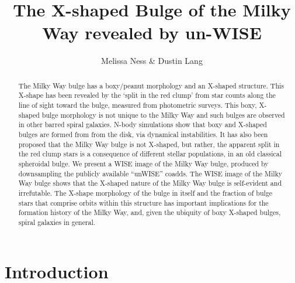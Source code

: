 \documentclass[12pt, preprint]{aastex}
\begin{document}
\title{The X-shaped Bulge of the Milky Way revealed by un-WISE} 
\author{%
Melissa Ness \& %
Dustin Lang
}
%
\begin{abstract}%
The Milky Way bulge has a boxy/peanut morphology and an X-shaped structure. This X-shape has been revealed by the `split in the red clump' from 
star counts along the line of sight toward the bulge, measured from photometric surveys. This boxy, X-shaped bulge morphology is not unique to the Milky Way and such bulges are observed in other barred spiral galaxies.  N-body simulations show that boxy and X-shaped bulges are formed from from the disk, via dynamical instabilities.  It has also been proposed that the Milky Way bulge is not X-shaped, but rather, the apparent split in the red clump stars is a consequence of different stellar populations, in an old classical spheroidal bulge. We present a WISE image of the Milky Way bulge, produced by downsampling the publicly available ``unWISE'' coadds. The WISE image of the Milky Way bulge shows that the X-shaped nature of the Milky Way bulge is self-evident and irrefutable. The X-shape morphology of the bulge in itself and the fraction of bulge stars that comprise orbits within this structure has important implications for the formation history of the Milky Way, and, given the ubiquity of boxy X-shaped bulges, spiral galaxies in general. 
\end{abstract}



\keywords{%
}

\section{Introduction}\label{sec:Intro}
\end{document}
